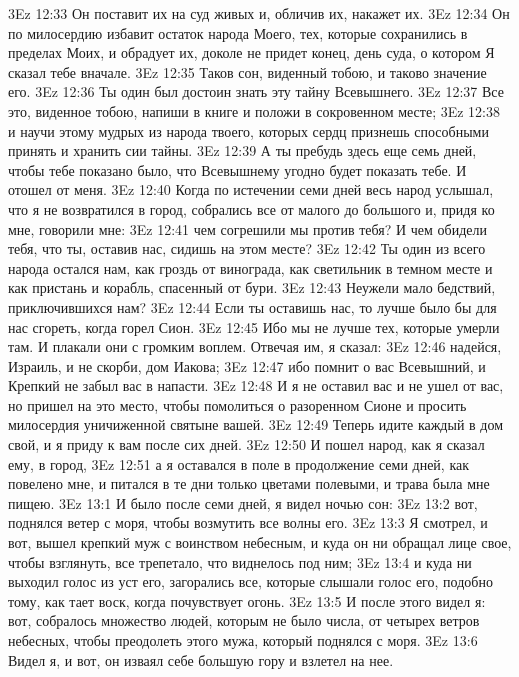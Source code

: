 \vs 3Ez 12:33 Он поставит их на суд живых и, обличив их, накажет их.
\vs 3Ez 12:34 Он по милосердию избавит остаток народа Моего, тех, которые сохранились в пределах Моих, и обрадует их, доколе не придет конец, день суда, о котором Я сказал тебе вначале.
\vs 3Ez 12:35 Таков сон, виденный тобою, и таково значение его.
\vs 3Ez 12:36 Ты один был достоин знать эту тайну Всевышнего.
\vs 3Ez 12:37 Все это, виденное тобою, напиши в книге и положи в сокровенном месте;
\vs 3Ez 12:38 и научи этому мудрых из народа твоего, которых сердц признешь способными принять и хранить сии тайны.
\vs 3Ez 12:39 А ты пребудь здесь еще семь дней, чтобы тебе показано было, что Всевышнему угодно будет показать тебе. И отошел от меня.
\rsbpar\vs 3Ez 12:40 Когда по истечении семи дней весь народ услышал, что я не возвратился в город, собрались все от малого до большого и, придя ко мне, говорили мне:
\vs 3Ez 12:41 чем согрешили мы против тебя? И чем обидели тебя, что ты, оставив нас, сидишь на этом месте?
\vs 3Ez 12:42 Ты один из всего народа остался нам, как гроздь от винограда, как светильник в темном месте и как пристань и корабль, спасенный от бури.
\vs 3Ez 12:43 Неужели мало бедствий, приключившихся нам?
\vs 3Ez 12:44 Если ты оставишь нас, то лучше было бы для нас сгореть, когда горел Сион.
\vs 3Ez 12:45 Ибо мы не лучше тех, которые умерли там. И плакали они с громким воплем. Отвечая им, я сказал:
\vs 3Ez 12:46 надейся, Израиль, и не скорби, дом Иакова;
\vs 3Ez 12:47 ибо помнит о вас Всевышний, и Крепкий не забыл вас в напасти.
\vs 3Ez 12:48 И я не оставил вас и не ушел от вас, но пришел на это место, чтобы помолиться о разоренном Сионе и просить милосердия уничиженной святыне вашей.
\vs 3Ez 12:49 Теперь идите каждый в дом свой, и я приду к вам после сих дней.
\vs 3Ez 12:50 И пошел народ, как я сказал ему, в город,
\vs 3Ez 12:51 а я оставался в поле в продолжение семи дней, как повелено мне, и питался в те дни только цветами полевыми, и трава была мне пищею.
\vs 3Ez 13:1 И было после семи дней, я видел ночью сон:
\vs 3Ez 13:2 вот, поднялся ветер с моря, чтобы возмутить все волны его.
\vs 3Ez 13:3 Я смотрел, и вот, вышел крепкий муж с воинством небесным, и куда он ни обращал лице свое, чтобы взглянуть, все трепетало, что виднелось под ним;
\vs 3Ez 13:4 и куда ни выходил голос из уст его, загорались все, которые слышали голос его, подобно тому, как тает воск, когда почувствует огонь.
\vs 3Ez 13:5 И после этого видел я: вот, собралось множество людей, которым не было числа, от четырех ветров небесных, чтобы преодолеть этого мужа, который поднялся с моря.
\vs 3Ez 13:6 Видел я, и вот, он изваял себе большую гору и взлетел на нее.
